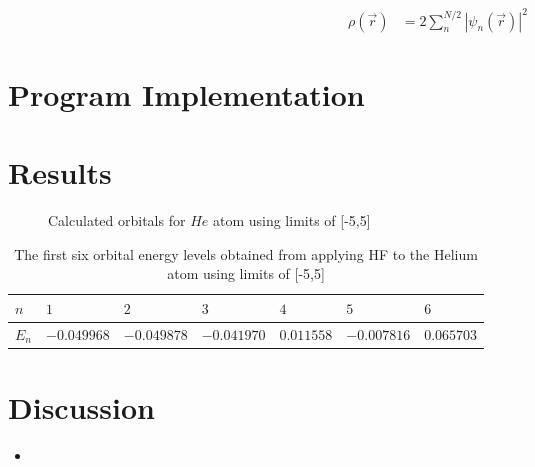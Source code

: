 \documentclass[10pt, oneside, letterpaper]{article}
\begin{document}
\begin{align*}
\rho(\vec{r}) &= 2 \sum_{n}^{N/2}\left|\psi_n(\vec{r})\right|^2
\end{align*}



\newpage
\section{Program Implementation}


\newpage
\section{Results}

\begin{figure}[H]
  \begin{center}
  \end{center}
  \caption{Calculated orbitals for $He$ atom using limits of [-5,5]}
  \label{he-plot}
\end{figure}

\begin{table}[H]
\begin{center}
\begin{tabular}{l|llllll}\hline
$n$    & $1$    & $2$     & $3$     & $4$      & $5$      & $6$      \\\hline
$E_n$  & $-0.049968$  & $-0.049878$  & $-0.041970$  & $0.011558$  & $-0.007816$  & $0.065703$ \\\hline
\end{tabular}
\end{center}
  \caption{The first six orbital energy levels obtained from applying HF to the Helium atom using limits of [-5,5]}
  \label{orbital-energies-he}
\end{table}

\newpage
\section{Discussion}

\begin{itemize}
    \item 
\end{itemize}
\end{document}
